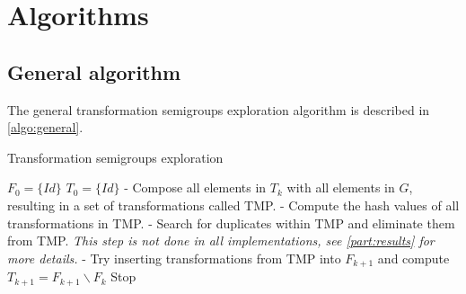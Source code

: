 {%

\section{ Algorithms}
\label{part:algo}
\subsection{General algorithm}
The general transformation semigroups exploration algorithm is described in \autoref{algo:general}.

\begin{algorithm}
\caption{Transformation semigroups exploration}
\label{algo:general}
\begin{algorithmic}
\STATE $F_0 = \{Id\}$
\STATE $T_0 = \{Id\}$
\STATE - Compose all elements in $T_k$ with all elements in $G$, resulting in a set of transformations called TMP.
\STATE - Compute the hash values of all transformations in TMP.
\STATE - Search for duplicates within TMP and eliminate them from TMP. \emph{This step is not done in all implementations, see \autoref{part:results} for more details.}
\STATE - Try inserting transformations from TMP into $F_{k+1}$ and compute $T_{k+1}=F_{k+1} \backslash F_k$
\STATE Stop
\ENDIF
\ENDFOR
\end{algorithmic}
\end{algorithm}

}
